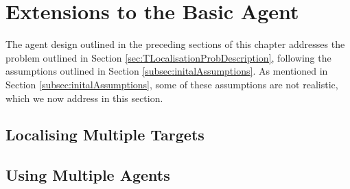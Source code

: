 \section{Extensions to the Basic Agent}
The agent design outlined in the preceding sections of this chapter addresses the problem outlined in Section \ref{sec:TLocalisationProbDescription},  following the assumptions outlined in Section \ref{subsec:initalAssumptions}. As mentioned in Section \ref{subsec:initalAssumptions}, some of these assumptions are not realistic, which we now address in this section. \par

\subsection{Localising Multiple Targets}\label{subsubsec:LocalisingMultipleTargets}


\subsection{Using Multiple Agents}\label{subsubsec:UsingMultipleAgents}
